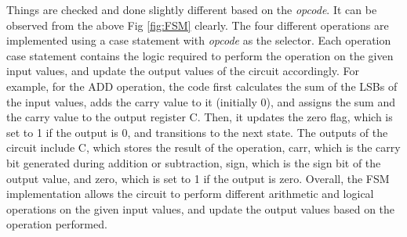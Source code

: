 Things are checked and done slightly different based on the \textit{opcode}.
It can be observed from the above Fig \ref{fig:FSM} clearly.
The four different operations are implemented using a case statement with \textit{opcode} as the selector.
Each operation case statement contains the logic required to perform the operation on the given input values, and update the output values of the circuit accordingly.
For example, for the ADD operation, the code first calculates the sum of the LSBs of the input values, adds the carry value to it (initially 0),
and assigns the sum and the carry value to the output register C.
Then, it updates the zero flag, which is set to 1 if the output is 0, and transitions to the next state.
The outputs of the circuit include C, which stores the result of the operation,
carr, which is the carry bit generated during addition or subtraction,
sign, which is the sign bit of the output value, and zero, which is set to 1 if the output is zero.
Overall, the FSM implementation allows the circuit to perform different arithmetic and logical
operations on the given input values, and update the output values based on the operation performed.